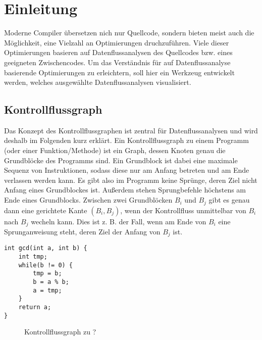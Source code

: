 
\section{Einleitung}

Moderne Compiler übersetzen nich nur Quellcode, sondern bieten meist auch die Möglichkeit, eine Vielzahl an Optimierungen druchzuführen. 
Viele dieser Optimierungen basieren auf Datenflussanalysen des Quellcodes bzw. eines geeigneten Zwischencodes.
Um das Verständnis für auf Datenflussanalyse basierende Optimierungen zu erleichtern, soll hier ein Werkzeug entwickelt werden, welches ausgewählte Datenflussanalysen visualisiert.

\subsection{Kontrollflussgraph}
Das Konzept des Kontrollflussgraphen ist zentral für Datenflussanalysen und wird deshalb im Folgenden kurz erklärt.
Ein Kontrollflussgraph zu einem Programm (oder einer Funktion/Methode) ist ein Graph, dessen Knoten genau die Grundblöcke des Programms sind.
Ein Grundblock ist dabei eine maximale Sequenz von Instruktionen, sodass diese nur am Anfang betreten und am Ende verlassen werden kann. 
Es gibt also im Programm keine Sprünge, deren Ziel nicht Anfang eines Grundblockes ist.
Außerdem stehen Sprungbefehle höchstens am Ende eines Grundblocks.
Zwischen zwei Grundblöcken $B_i$ und $B_j$ gibt es genau dann eine gerichtete Kante $(B_i,B_j)$, wenn der Kontrollfluss unmittelbar von $B_i$ nach $B_j$ wecheln kann.
Dies ist z. B. der Fall, wenn am Ende von $B_i$ eine Sprunganweisung steht, deren Ziel der Anfang von $B_j$ ist.
\begin{lstlisting}[frame=single]
int gcd(int a, int b) {
	int tmp;
	while(b != 0) {
		tmp = b;
		b = a % b;
		a = tmp;
	}
	return a;
}
\end{lstlisting}

\begin{figure}[H]
\centering
{}
\caption{Kontrollflussgraph zu ?}
\end{figure}


